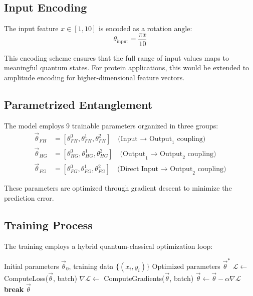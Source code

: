 \documentclass[11pt,a4paper]{article}
\begin{document}
\subsection{Input Encoding}

The input feature $x \in [1, 10]$ is encoded as a rotation angle:
\begin{equation}
\theta_{\text{input}} = \frac{\pi x}{10}
\end{equation}

This encoding scheme ensures that the full range of input values maps to meaningful quantum states. For protein applications, this would be extended to amplitude encoding for higher-dimensional feature vectors.

\subsection{Parametrized Entanglement}

The model employs 9 trainable parameters organized in three groups:
\begin{align}
\vec{\theta}_{FH} &= [\theta_{FH}^0, \theta_{FH}^1, \theta_{FH}^2] \quad \text{(Input → Output}_1\text{ coupling)} \\
\vec{\theta}_{HG} &= [\theta_{HG}^0, \theta_{HG}^1, \theta_{HG}^2] \quad \text{(Output}_1 \text{ → Output}_2\text{ coupling)} \\
\vec{\theta}_{FG} &= [\theta_{FG}^0, \theta_{FG}^1, \theta_{FG}^2] \quad \text{(Direct Input → Output}_2\text{ coupling)}
\end{align}

These parameters are optimized through gradient descent to minimize the prediction error.

\subsection{Training Process}

The training employs a hybrid quantum-classical optimization loop:

\begin{algorithm}
\caption{Quantum Model Training}
\begin{algorithmic}
\REQUIRE Initial parameters $\vec{\theta}_0$, training data $\{(x_i, y_i)\}$
\ENSURE Optimized parameters $\vec{\theta}^*$
        \STATE $\mathcal{L} \leftarrow$ ComputeLoss($\vec{\theta}$, batch)
        \STATE $\nabla\mathcal{L} \leftarrow$ ComputeGradients($\vec{\theta}$, batch)
        \STATE $\vec{\theta} \leftarrow \vec{\theta} - \alpha \nabla\mathcal{L}$
    \ENDFOR
        \STATE \textbf{break}
    \ENDIF
\ENDFOR
\RETURN $\vec{\theta}$
\end{algorithmic}
\end{algorithm}
\end{document}
